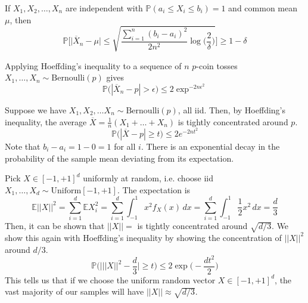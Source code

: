 \documentclass{article}
\begin{document}
      \begin{corollary}
        If $X_1, X_2, \ldots, X_n$ are independent with $\mathbb{P}(a_i \leq X_i \leq b_i) = 1$ and common mean $\mu$, then 
        \begin{equation}
          \mathbb{P}\bigg[ \big| \overline{X}_n - \mu \big| \leq \sqrt{ \frac{\sum_{i=1}^n (b_i - a_i)^2}{2n^2} \log \Big(\frac{2}{\delta}\Big)} \bigg] \geq 1 - \delta
        \end{equation}
      \end{corollary}

      \begin{example}[Bernoulli]
        Applying Hoeffding's inequality to a sequence of $n$ $p$-coin tosses $X_1, \ldots, X_n \sim \mathrm{Bernoulli}(p)$ gives 
        \begin{equation}
          \mathbb{P}\big( | \overline{X}_n - p | > \epsilon \big) \leq 2 \exp^{-2 n \epsilon^2}
        \end{equation}
      \end{example}

      \begin{example}[Mean]
        Suppose we have $X_1, X_2, \ldots X_n \sim \mathrm{Bernoulli}(p)$, all iid. Then, by Hoeffding's inequality, the average $\overline{X} = \frac{1}{n} (X_1 + \ldots + X_n)$ is tightly concentrated around $p$. 
        \begin{equation}
          \mathbb{P} \big( | \overline{X} - p | \geq t \big) \leq 2 e^{-2 n t^2}
        \end{equation}
        Note that $b_i - a_i = 1 - 0 = 1$ for all $i$. There is an exponential decay in the probability of the sample mean deviating from its expectation. 
      \end{example}

      \begin{example}[Hypercube]
        Pick $X \in [-1, +1]^d$ uniformly at random, i.e. choose iid $X_1,\ldots, X_d \sim \mathrm{Uniform}[-1, +1]$. The expectation is 
        \begin{equation}
          \mathbb{E} ||X||^2 = \sum_{i=1}^d \mathbb{E} X_i^2 = \sum_{i=1}^d \int_{-1}^1 x^2 f_X (x) \,dx = \sum_{i=1}^d \int_{-1}^1 \frac{1}{2} x^2 \,dx = \frac{d}{3}
        \end{equation}
        Then, it can be shown that $||X|| = $ is tightly concentrated around $\sqrt{d/3}$. We show this again with Hoeffding's inequality by showing the concentration of $||X||^2$ around $d/3$. 
        \begin{equation}
          \mathbb{P} \bigg( \bigg| ||X||^2 - \frac{d}{3} \bigg| \geq t \bigg) \leq 2 \exp \Big( - \frac{ d t^2}{2} \Big)
        \end{equation}
        This tells us that if we choose the uniform random vector $X \in [-1, +1]^d$, the vast majority of our samples will have $||X|| \approx \sqrt{d/3}$. 
      \end{example}
\end{document}
